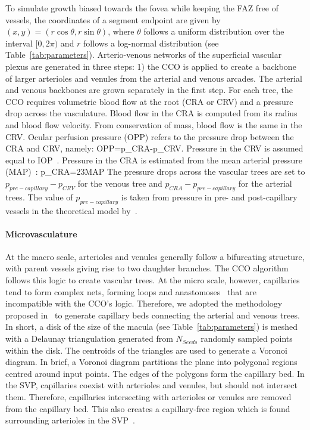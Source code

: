 \documentclass[11pt,]{article}
\let\oldequation\equation
\let\oldendequation\endequation
\renewenvironment{equation}
  {\linenomathNonumbers\oldequation}
  {\oldendequation\endlinenomath}
\begin{document}
To simulate growth biased towards the fovea while keeping the FAZ free
of vessels, the coordinates of a segment endpoint are given by
$(x,y)=(r\cos\theta, r\sin\theta)$, where $\theta$ follows a uniform
distribution over the interval $[0,2\pi)$ and $r$ follows a log-normal
distribution (see Table~\ref{tab:parameters}). Arterio-venous
networks of the superficial vascular plexus are generated in three
steps: 1) the CCO is applied to create a backbone of larger arterioles
and venules from the arterial and venous arcades. The arterial and
venous backbones are grown separately in the first step. For each
tree, the CCO requires volumetric blood flow at the root (CRA or CRV)
and a pressure drop across the vasculature. Blood flow in the CRA is
computed from its radius and blood flow velocity. From conservation of
mass, blood flow is the same in the CRV.
Ocular perfusion pressure (OPP) refers to the pressure drop between the CRA and CRV, namely:
\begin{equation}
OPP=p_{CRA}-p_{CRV}.\label{eq:OPP}
\end{equation}
Pressure in the CRV is assumed equal to IOP~\cite{Arciero2013,Guidoboni2014,Zheng2010}.
Pressure in the CRA is estimated from the mean arterial pressure (MAP)~\cite{Arciero2013,Guidoboni2014,Zheng2010}:
\begin{equation}
p_{CRA}=\frac23MAP\label{eq:pCRA}
\end{equation}
The pressure drops across the vascular trees are set to
$p_{pre-capillary}-p_{CRV}$ for the venous tree and
$p_{CRA}-p_{pre-capillary}$ for the arterial trees. The value of
$p_{pre-capillary}$ is taken from pressure in pre- and post-capillary vessels in
the theoretical model by~\cite{Takahashi2009}. %

\paragraph{Microvasculature}\label{sec:microvasculature} At the macro
scale, arterioles and venules generally follow a bifurcating
structure, with parent vessels giving rise to two daughter
branches. The CCO algorithm follows this logic to create vascular
trees.  At the micro scale, however, capillaries tend to form complex
nets, forming loops and anastomoses~\cite{An2020} that are
incompatible with the CCO’s logic.
Therefore, we adopted the methodology proposed in~\cite{Linninger2013} to generate capillary beds connecting
the arterial and venous trees.
In short, a disk of the size of the macula (see Table~\ref{tab:parameters}) is meshed with a Delaunay
triangulation generated from $N_{Seeds}$ randomly sampled points
within the disk.
The centroids of the triangles are used to generate a Voronoi diagram.
In brief, a Voronoi diagram partitions the plane into polygonal regions centred around input points. 
The edges of the polygons form the capillary bed.
In the SVP, capillaries coexist with arterioles and venules, but should not intersect them.
Therefore, capillaries intersecting with arterioles or venules are removed from the capillary bed.
This also creates a capillary-free region which is found surrounding arterioles in the SVP~\cite{An2020}.
\end{document}
